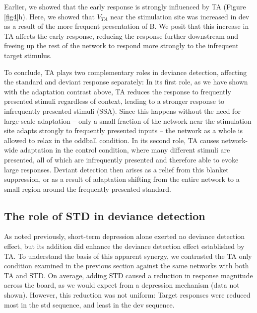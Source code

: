 \documentclass[pdflatex,referee,iicol,sn-basic]{sn-jnl}
\theoremstyle{thmstyleone}%
\theoremstyle{thmstyletwo}%
\theoremstyle{thmstylethree}%
\begin{document}
Earlier, we showed that the early response is strongly influenced by TA (Figure \ref{fig4}h). Here, we showed that $V_{TA}$ near the stimulation site was increased in dev as a result of the more frequent presentation of B. We posit that this increase in TA affects the early response, reducing the response further downstream and freeing up the rest of the network to respond more strongly to the infrequent target stimulus.

To conclude, TA plays two complementary roles in deviance detection, affecting the standard and deviant response separately: In its first role, as we have shown with the adaptation contrast above, TA reduces the response to frequently presented stimuli regardless of context, leading to a stronger response to infrequently presented stimuli (SSA). Since this happens without the need for large-scale adaptation -- only a small fraction of the network near the stimulation site adapts strongly to frequently presented inputs -- the network as a whole is allowed to relax in the oddball condition. In its second role, TA causes network-wide adaptation in the control condition, where many different stimuli are presented, all of which are infrequently presented and therefore able to evoke large responses. Deviant detection then arises as a relief from this blanket suppression, or as a result of adaptation shifting from the entire network to a small region around the frequently presented standard.

\subsection{The role of STD in deviance detection}\label{sec-std}

As noted previously, short-term depression alone exerted no deviance detection effect, but its addition did enhance the deviance detection effect established by TA. To understand the basis of this apparent synergy, we contrasted the TA only condition examined in the previous section against the same networks with both TA and STD. On average, adding STD caused a reduction in response magnitude across the board, as we would expect from a depression mechanism (data not shown). However, this reduction was not uniform: Target responses were reduced most in the std sequence, and least in the dev sequence.
\end{document}
